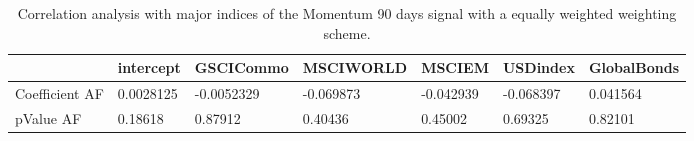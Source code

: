 \begin{table}[H]
\centering
\begin{tabular}{lllllll}
\hline& intercept & GSCICommo & MSCIWORLD & MSCIEM & USDindex & GlobalBonds \\ 
\hline 
Coefficient AF & 0.0028125 & -0.0052329 & -0.069873 & -0.042939 & -0.068397 & 0.041564 \\ 
pValue AF & 0.18618 & 0.87912 & 0.40436 & 0.45002 & 0.69325 & 0.82101 \\ 
\hline
\end{tabular}
\caption{Correlation analysis with major indices of the Momentum 90 days signal with a equally weighted weighting scheme.}
\label{MOM90EW_AFACTOR}
\end{table}